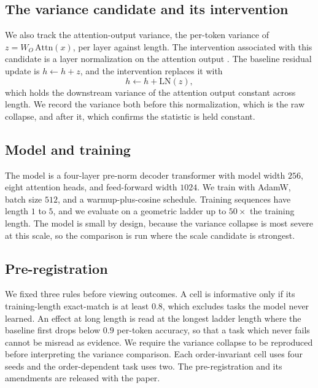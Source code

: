 \documentclass[letterpaper]{article} %
\begin{document}
\subsection{The variance candidate and its intervention}

We also track the attention-output variance, the per-token variance of $z = W_O\,\mathrm{Attn}(x)$, per
layer against length.
The intervention associated with this candidate is a layer normalization on the attention output
\citep{vanishingvariance}.
The baseline residual update is $h \leftarrow h + z$, and the intervention replaces it with
\begin{equation}
h \leftarrow h + \mathrm{LN}(z),
\end{equation}
which holds the downstream variance of the attention output constant across length.
We record the variance both before this normalization, which is the raw collapse, and after it, which
confirms the statistic is held constant.

\subsection{Model and training}

The model is a four-layer pre-norm decoder transformer with model width $256$, eight attention heads, and
feed-forward width $1024$.
We train with AdamW, batch size $512$, and a warmup-plus-cosine schedule.
Training sequences have length $1$ to $5$, and we evaluate on a geometric ladder up to $50\times$ the
training length.
The model is small by design, because the variance collapse is most severe at this scale, so the
comparison is run where the scale candidate is strongest.

\subsection{Pre-registration}

We fixed three rules before viewing outcomes.
A cell is informative only if its training-length exact-match is at least $0.8$, which excludes tasks the
model never learned.
An effect at long length is read at the longest ladder length where the baseline first drops below $0.9$
per-token accuracy, so that a task which never fails cannot be misread as evidence.
We require the variance collapse to be reproduced before interpreting the variance comparison.
Each order-invariant cell uses four seeds and the order-dependent task uses two.
The pre-registration and its amendments are released with the paper.
\end{document}
